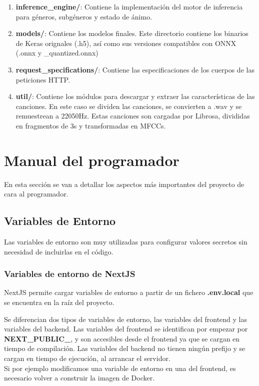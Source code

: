 \begin{enumerate}
    \item \textbf{inference\_engine/}: Contiene la implementación del motor de inferencia para géneros, subgéneros y estado de ánimo.
    \item \textbf{models/}: Contiene los modelos finales. Este directorio contiene los binarios de Keras orignales (.h5), así como sus versiones compatibles con ONNX (.onnx y \_quantized.onnx)
    \item \textbf{request\_specifications/}: Contiene las especificaciones de los cuerpos de las peticiones HTTP.
    \item \textbf{util/}: Contiene los módulos para descargar y extraer las características de las canciones. En este caso se dividen las canciones, se convierten a .wav y se remuestrean a 22050Hz. Estas canciones son cargadas por Librosa, divididas en fragmentos de 3s y transformadas en MFCCs.
\end{enumerate}


\section{Manual del programador}

En esta sección se van a detallar los aspectos más importantes del proyecto de cara al programador. 

\subsection{Variables de Entorno} \label{env:}

Las variables de entorno son muy utilizadas para configurar valores secretos sin necesidad de incluirlas en el código.

\subsubsection{Variables de entorno de NextJS}
NextJS permite cargar variables de entorno a partir de un fichero \textbf{.env.local} que se encuentra en la raíz del proyecto. 

Se diferencian dos tipos de variables de entorno, las variables del frontend y las variables del backend. Las variables del frontend se identifican por empezar por \textbf{NEXT\_PUBLIC\_}, y son accesibles desde el frontend ya que se cargan en tiempo de compilación. Las variables del backend no tienen ningún prefijo y se cargan en tiempo de ejecución, al arrancar el servidor.\\
Si por ejemplo modificamos una variable de entorno en una del frontend, es necesario volver a construir la imagen de Docker. 


